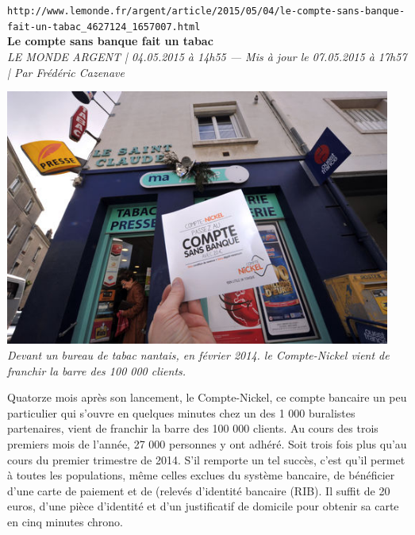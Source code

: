 \documentclass[11pt,twoside,a4paper]{article}
\begin{document}
\clearpage

\texttt{\small http://www.lemonde.fr/argent/article/2015/05/04/le-compte-sans-banque-fait-un-tabac\_4627124\_1657007.html}~\\

\textbf{\Large Le compte sans banque fait un tabac}~\\
\emph{ LE MONDE ARGENT | 04.05.2015 {\`a} 14h55 --- Mis {\`a} jour le 07.05.2015 {\`a} 17h57 | Par Fr{\'e}d{\'e}ric Cazenave }~\\

\begin{minipage}[h]{0.23\textwidth}
	\includegraphics[width=0.95\textwidth]{img/4629281_6_a383_devant-un-bureau-de-tabac-nantais-en-fevrier_f32148e2c21cddc3f51a1bd877ad7d65.jpg} ~\\
	\emph{Devant un bureau de tabac nantais, en f{\'e}vrier 2014. le Compte-Nickel vient de franchir la barre des 100 000 clients.}~\\
\end{minipage} \hfill \begin{minipage}[h]{0.75\textwidth}
	Quatorze mois apr{\`e}s son lancement, le Compte-Nickel, ce compte bancaire un peu particulier qui s'ouvre en quelques minutes chez un des 1 000 buralistes partenaires, vient de franchir la barre des 100  000 clients. Au cours des trois premiers mois de l'ann{\'e}e, 27 000 personnes y ont adh{\'e}r{\'e}. Soit trois fois plus qu'au cours du premier trimestre de 2014. S'il remporte un tel succ{\`e}s, c'est qu'il permet {\`a} toutes les populations, m{\^e}me celles exclues du syst{\`e}me bancaire, de b{\'e}n{\'e}ficier d'une carte de paiement et de (relev{\'e}s d'identit{\'e} bancaire (RIB). Il suffit de 20 euros, d'une pi{\`e}ce d'identit{\'e} et d'un justificatif de domicile pour obtenir sa carte en cinq minutes chrono. ~\\


\end{minipage}
\end{document}
